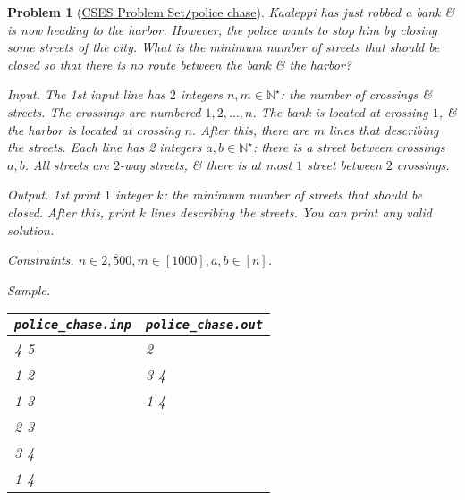 \documentclass{article}
\newtheorem{problem}{Problem}
\begin{document}
\begin{problem}[\href{https://cses.fi/problemset/task/1695}{CSES Problem Set{\tt/}police chase}]
    Kaaleppi has just robbed a bank \& is now heading to the harbor. However, the police wants to stop him by closing some streets of the city. What is the minimum number of streets that should be closed so that there is no route between the bank \& the harbor?
    \item {\sf Input.} The 1st input line has $2$ integers $n,m\in\mathbb{N}^\star$: the number of crossings \& streets. The crossings are numbered $1,2,\ldots,n$. The bank is located at crossing $1$, \& the harbor is located at crossing $n$. After this, there are $m$ lines that describing the streets. Each line has 2 integers $a,b\in\mathbb{N}^\star$: there is a street between crossings $a,b$. All streets are $2$-way streets, \& there is at most $1$ street between $2$ crossings.
    \item {\sf Output.} 1st print $1$ integer $k$: the minimum number of streets that should be closed. After this, print $k$ lines describing the streets. You can print any valid solution.
    \item {\sf Constraints.} $n\in\overline{2,500},m\in[1000],a,b\in[n]$.
    \item {\sf Sample.}
    \begin{table}[H]
        \centering
        \begin{tabular}{|l|l|}
            \hline
            \verb|police_chase.inp| & \verb|police_chase.out| \\
            \hline
            4 5 & 2 \\
            1 2 & 3 4 \\
            1 3 & 1 4 \\
            2 3 & \\
            3 4 & \\
            1 4 & \\
            \hline
        \end{tabular}
    \end{table}
\end{problem}
\end{document}
